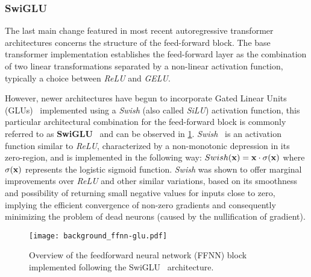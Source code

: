 \subsubsection*{SwiGLU}

The last main change featured in most recent autoregressive transformer architectures concerns the structure of the feed-forward block.
The base transformer implementation establishes the feed-forward layer as the combination of two linear transformations separated by a non-linear activation function, typically a choice between \emph{ReLU} and \emph{GELU}.

However, newer architectures have begun to incorporate Gated Linear Units (GLUs)~\cite{dauphin2017} implemented using a \emph{Swish} (also called \emph{SiLU}) activation function, this particular architectural combination for the feed-forward block is commonly referred to as \textbf{SwiGLU}~\cite{shazeer2020} and can be observed in \cref{fig:background_ffnn-glu}.
\emph{Swish}~\cite{shazeer2020} is an activation function similar to \emph{ReLU}, characterized by a non-monotonic depression in its zero-region, and is implemented in the following way: $Swish(\bm{\mathbf{x}}) = \bm{\mathbf{x}} \cdot \sigma(\bm{\mathbf{x}})$ where $\sigma(\bm{\mathbf{x}})$ represents the logistic sigmoid function.
\emph{Swish} was shown to offer marginal improvements over \emph{ReLU} and other similar variations, based on its smoothness and possibility of returning small negative values for inputs close to zero, implying the efficient convergence of non-zero gradients and consequently minimizing the problem of dead neurons (caused by the nullification of gradient).

\begin{figure}[t!]
    \centering
    \texttt{[image: background\_ffnn-glu.pdf]}
    \caption{Overview of the feedforward neural network (FFNN) block implemented following the SwiGLU~\cite{shazeer2020} architecture.}
    \label{fig:background_ffnn-glu}
\end{figure}


